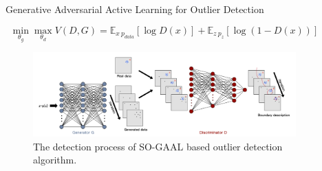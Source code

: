 \documentclass[final]{beamer}
\newlength{\sepwidth}
\newlength{\colwidth}
\newcommand{\separatorcolumn}{\begin{column}{\sepwidth}\end{column}}
\begin{document}
\begin{frame}[t]
\begin{columns}[t]
\begin{column}{\colwidth}
\end{column}

\separatorcolumn

\begin{column}{\colwidth}

  \begin{exampleblock}{Generative Adversarial Active Learning for Outlier Detection}
  	
  
   
  	$$
  	\min_{\theta_g}\max_{\theta_d}V(D,G)=\mathbb{E}_{x~p_{data}}[\log D(x)]+\mathbb{E}_{z~p_{z}}[\log(1-D(x))]
  	$$
  	
  	\begin{figure}
  		\centering
  		\includegraphics{figures/SO-GAAL.png}
  		\caption{The detection process of SO-GAAL based outlier detection algorithm.}
  	\end{figure}
  

\end{exampleblock}
\end{column}
\end{columns}
\end{frame}
\end{document}
